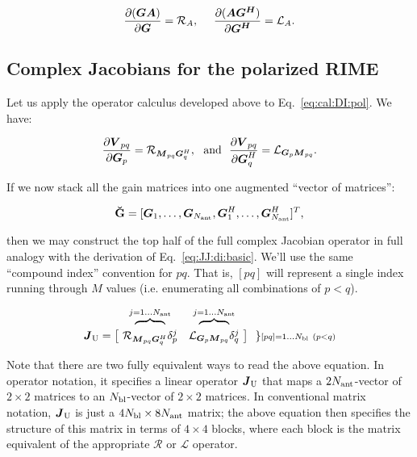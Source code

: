 \documentclass[useAMS,usenatbib]{mn2e}
\newcommand{\mat}[1]{{\bmath{#1}}}
\newcommand{\JJ}{\mat{J}} %
\newcommand{\MM}{\mat{M}}
\newcommand{\VV}{\mat{V}}
\newcommand{\GG}{\mat{G}}
\newcommand{\AUGx}[1]{\mathbf{\breve{#1}}}
\newcommand{\GGg}{\AUGx{G}}
\newcommand{\TOP}{\mathrm{U}}%
\newcommand{\Rop}[1]{\mathcal{R}_{{#1}}}
\newcommand{\Lop}[1]{\mathcal{L}_{{#1}}}
\begin{document}
\[
\frac{\partial(\mat{GA})}{\partial{\mat{G}}} = \Rop{A},~~~~\frac{\partial(\mat{AG^H})}{\partial{\mat{G^H}}} = \Lop{A}.
\]

\subsection{Complex Jacobians for the polarized RIME}

Let us apply the operator calculus developed above to Eq.~\ref{eq:cal:DI:pol}. We have:

\begin{equation}
\label{eq:dR:dG}
\frac{\partial\VV_{pq}}{\partial\GG_p} = \Rop{\MM_{pq}\GG^H_q},\mathrm{~~and~~}
\frac{\partial\VV_{pq}}{\partial\GG^H_q} = \Lop{\GG_p \MM_{pq}}.
\end{equation}

If we now stack all the gain matrices into one augmented ``vector of matrices'':

\begin{equation}
\label{eq:GGvec}
\GGg = [ \GG_1,\dots,\GG_{\scriptstyle \Na},\GG^H_1,\dots,\GG^H_{\scriptstyle \Na} ]^T,
\end{equation}

then we may construct the top half of the full complex Jacobian operator in full analogy with the 
derivation of Eq.~\ref{eq:JJ:di:basic}. We'll use the same ``compound index'' convention for $pq$. That is, 
$[pq]$ will represent a single index running through $M$ values (i.e. enumerating all combinations of $p<q$).

\begin{equation}
\label{eq:JJtop}
\begin{array}{r@{~}cc@{~}cc}
  & \overbrace{~~~~~~~~}^{j=1\dots \Na} & \overbrace{~~~~~~~~}^{j=1\dots \Na} \\

\JJ_\TOP = \big [ & 
\Rop{ \MM_{pq}\GG^H_q }\delta^j_p & 
\Lop{ \GG_p \MM_{pq}  }\delta^j_q 
& \big ] ~~ \} \scriptstyle [pq]=1\dots \Nbl~(p<q)
% 
\end{array}
\end{equation}

Note that there are two fully equivalent ways to read the above equation. In operator notation, it specifies a linear operator 
$\JJ_\TOP$
that maps a $2N_\mathrm{ant}$-vector of $2\times2$ matrices to an $N_\mathrm{bl}$-vector of $2\times2$ matrices. In conventional matrix notation, 
$\JJ_\TOP$ is just a $4N_\mathrm{bl}\times8N_\mathrm{ant}$ matrix; the above equation then specifies the structure of this matrix in terms
of $4\times4$ blocks, where each block is the matrix equivalent of the appropriate $\mathcal{R}$ or $\mathcal{L}$ operator.
\end{document}

